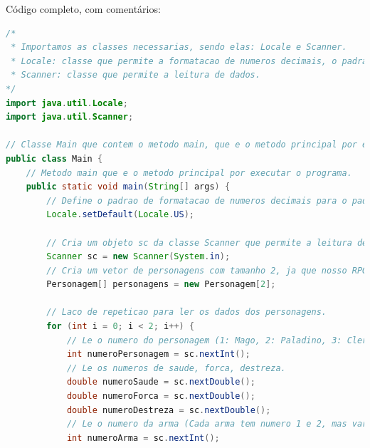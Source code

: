 \documentclass[11pt]{uiobrev}
\begin{document}
    Código completo, com comentários: 

\begin{lstlisting}[language=Java, caption={Codigo Principal do Programa}]
/*
 * Importamos as classes necessarias, sendo elas: Locale e Scanner.
 * Locale: classe que permite a formatacao de numeros decimais, o padrao do Brasileiro e diferente do padrao Americano. O padrao brasileiro utiliza virgula como separador de casas decimais, enquanto o padrao americano utiliza ponto.
 * Scanner: classe que permite a leitura de dados.
*/
import java.util.Locale;
import java.util.Scanner;

// Classe Main que contem o metodo main, que e o metodo principal por executar o programa.
public class Main {
    // Metodo main que e o metodo principal por executar o programa.
    public static void main(String[] args) {
        // Define o padrao de formatacao de numeros decimais para o padrao americano.
        Locale.setDefault(Locale.US);

        // Cria um objeto sc da classe Scanner que permite a leitura de dados.
        Scanner sc = new Scanner(System.in);
        // Cria um vetor de personagens com tamanho 2, ja que nosso RPG sera de dois personagens.
        Personagem[] personagens = new Personagem[2];

        // Laco de repeticao para ler os dados dos personagens.
        for (int i = 0; i < 2; i++) {
            // Le o numero do personagem (1: Mago, 2: Paladino, 3: Clerigo).
            int numeroPersonagem = sc.nextInt();
            // Le os numeros de saude, forca, destreza.
            double numeroSaude = sc.nextDouble();
            double numeroForca = sc.nextDouble();
            double numeroDestreza = sc.nextDouble();
            // Le o numero da arma (Cada arma tem numero 1 e 2, mas varia entre os personagens).
            int numeroArma = sc.nextInt();


\end{lstlisting}
\end{document}
